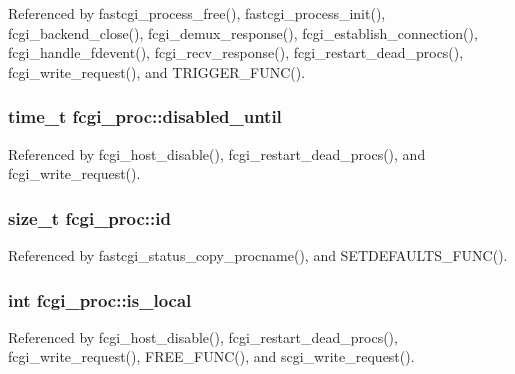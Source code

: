 Referenced by fastcgi\-\_\-process\-\_\-free(), fastcgi\-\_\-process\-\_\-init(), fcgi\-\_\-backend\-\_\-close(), fcgi\-\_\-demux\-\_\-response(), fcgi\-\_\-establish\-\_\-connection(), fcgi\-\_\-handle\-\_\-fdevent(), fcgi\-\_\-recv\-\_\-response(), fcgi\-\_\-restart\-\_\-dead\-\_\-procs(), fcgi\-\_\-write\-\_\-request(), and T\-R\-I\-G\-G\-E\-R\-\_\-\-F\-U\-N\-C().

\hypertarget{structfcgi__proc_a3fcc7200868e927373032de35766eadf}{
\subsubsection[{disabled\-\_\-until}]{\setlength{\rightskip}{0pt plus 5cm}time\-\_\-t fcgi\-\_\-proc\-::disabled\-\_\-until}}\label{structfcgi__proc_a3fcc7200868e927373032de35766eadf}


Referenced by fcgi\-\_\-host\-\_\-disable(), fcgi\-\_\-restart\-\_\-dead\-\_\-procs(), and fcgi\-\_\-write\-\_\-request().

\hypertarget{structfcgi__proc_a8e2a9a017e15271c6d043dd472fb5e82}{
\subsubsection[{id}]{\setlength{\rightskip}{0pt plus 5cm}size\-\_\-t fcgi\-\_\-proc\-::id}}\label{structfcgi__proc_a8e2a9a017e15271c6d043dd472fb5e82}


Referenced by fastcgi\-\_\-status\-\_\-copy\-\_\-procname(), and S\-E\-T\-D\-E\-F\-A\-U\-L\-T\-S\-\_\-\-F\-U\-N\-C().

\hypertarget{structfcgi__proc_acfd6df1d5a250b9b295c0f9e681114ac}{
\subsubsection[{is\-\_\-local}]{\setlength{\rightskip}{0pt plus 5cm}int fcgi\-\_\-proc\-::is\-\_\-local}}\label{structfcgi__proc_acfd6df1d5a250b9b295c0f9e681114ac}


Referenced by fcgi\-\_\-host\-\_\-disable(), fcgi\-\_\-restart\-\_\-dead\-\_\-procs(), fcgi\-\_\-write\-\_\-request(), F\-R\-E\-E\-\_\-\-F\-U\-N\-C(), and scgi\-\_\-write\-\_\-request().

